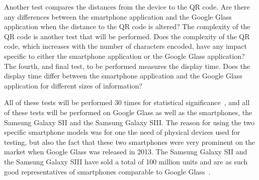 Another test compares the distances from the device to the QR code. Are there any differences between the smartphone application and the Google Glass application when the distance to the QR code is altered? The complexity of the QR code is another test that will be performed. Does the complexity of the QR code, which increases with the number of characters encoded, have any impact specific to either the smartphone application or the Google Glass application? The fourth, and final test, to be performed measures the display time. Does the display time differ between the smartphone application and the Google Glass application for different sizes of information?

All of these tests will be performed 30 times for statistical significance~\cite{30sampleSize}, and all of these tests will be performed on Google Glass as well as the smartphones, the Samsung Galaxy SII and the Samsung Galaxy SIII. The reason for using the two specific smartphone models was for one the need of physical devices used for testing, but also the fact that these two smartphones were very prominent on the market when Google Glass was released in 2013. The Samsung Galaxy SII and the Samsung Galaxy SIII have sold a total of 100 million units and are as such good representatives of smartphones comparable to Google Glass~\cite{samsungGalaxyS2Sales, samsungGalaxyS3Sales}.


